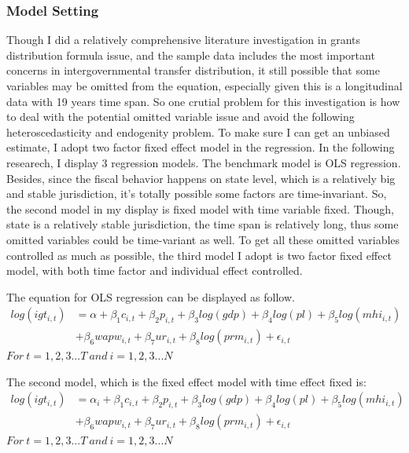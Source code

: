 \subsubsection{Model Setting}
Though I did a relatively comprehensive literature investigation in grants distribution formula issue, and the sample data includes the most important concerns in intergovernmental transfer distribution, it still possible that some variables may be omitted from the equation, especially given this is a longitudinal data with 19 years time span. So one crutial problem for this investigation is how to deal with the potential omitted variable issue and avoid the following heteroscedasticity and endogenity problem. To make sure I can get an unbiased estimate, I adopt two factor fixed effect model in the regression. In the following researech, I display 3 regression models. The benchmark model is OLS regression. Besides, since the fiscal behavior happens on state level, which is a relatively big and stable jurisdiction, it's totally possible some factors are time-invariant. So, the second model in my display is fixed model with time variable fixed. Though, state is a relatively stable jurisdiction, the time span is relatively long, thus some omitted variables could be time-variant as well. To get all these omitted variables controlled as much as possible, the third model I adopt is two factor fixed effect model, with both time factor and individual effect controlled.

The equation for OLS regression can be displayed as follow.
\begin{equation}
    \begin{split}
        log(igt_{i,t}) & = \alpha + \beta_1 c_{i,t} + \beta_2 p_{i,t} + \beta_3 log(gdp) + \beta_4 log(pl) + \beta_5 log(mhi_{i,t}) \\
        & + \beta_6 wapw_{i,t} + \beta_7 ur_{i,t} +\beta_8 log(prm_{i,t}) + \epsilon_{i,t}
    \end{split}
\end{equation}
$For\ t = 1, 2, 3...T\ and\ i = 1, 2, 3...N $

The second model, which is the fixed effect model with time effect fixed is:
\begin{equation}
    \begin{split}
        log(igt_{i,t}) & = \alpha_i + \beta_1 c_{i,t} + \beta_2 p_{i,t} + \beta_3 log(gdp) + \beta_4 log(pl) + \beta_5 log(mhi_{i,t}) \\
        &+ \beta_6 wapw_{i,t} + \beta_7 ur_{i,t} +\beta_8 log(prm_{i,t}) + \epsilon_{i,t}
    \end{split}
\end{equation}
$For\ t = 1, 2, 3...T\ and\ i = 1, 2, 3...N $

